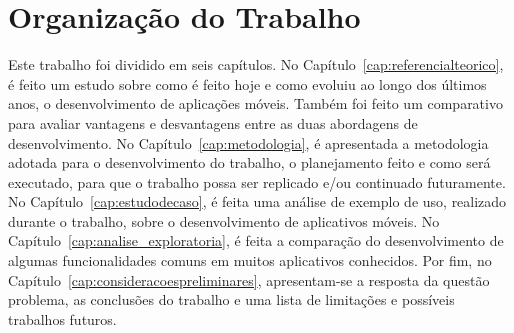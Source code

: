 \section{Organização do Trabalho}\label{sec:organizacao}

Este trabalho foi dividido em seis capítulos. %
No Capítulo~\ref{cap:referencialteorico}, é feito um estudo sobre como é feito hoje e como evoluiu ao longo dos últimos anos, o desenvolvimento de aplicações 
móveis. Também foi feito um comparativo para avaliar vantagens e desvantagens entre as duas abordagens de desenvolvimento. 
No Capítulo~\ref{cap:metodologia}, é apresentada a metodologia adotada para o desenvolvimento do trabalho, o planejamento feito e como será executado, para que 
o trabalho possa ser replicado e/ou continuado futuramente.  
No Capítulo~\ref{cap:estudodecaso}, é feita uma análise de exemplo de uso, realizado durante o trabalho, sobre o desenvolvimento de aplicativos móveis.
No Capítulo~\ref{cap:analise_exploratoria}, é feita a comparação do desenvolvimento de algumas funcionalidades comuns em muitos aplicativos conhecidos.
Por fim, no Capítulo~\ref{cap:consideracoespreliminares}, apresentam-se a resposta da questão problema, as conclusões do trabalho e uma lista de limitações e possíveis trabalhos futuros.  
